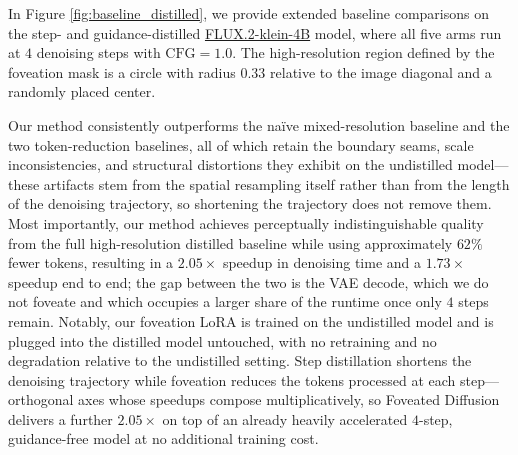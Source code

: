 
In Figure \ref{fig:baseline_distilled}, we provide extended baseline comparisons on the
step- and guidance-distilled
\href{https://huggingface.co/black-forest-labs/FLUX.2-klein-4B}{FLUX.2-klein-4B} model,
where all five arms run at $4$ denoising steps with $\text{CFG}=1.0$. The high-resolution region defined by the foveation mask is a circle
with radius $0.33$ relative to the image diagonal and a randomly placed center.

Our method consistently outperforms the na\"ive mixed-resolution baseline and the two
token-reduction baselines, all of which retain the boundary seams, scale inconsistencies,
and structural distortions they exhibit on the undistilled model---these artifacts stem
from the spatial resampling itself rather than from the length of the denoising
trajectory, so shortening the trajectory does not remove them. Most importantly, our
method achieves perceptually indistinguishable quality from the full high-resolution
distilled baseline while using approximately $62\%$ fewer tokens, resulting in a
$2.05\times$ speedup in denoising time and a $1.73\times$ speedup end to end; the gap
between the two is the VAE decode, which we do not foveate and which occupies a larger
share of the runtime once only $4$ steps remain. Notably, our foveation LoRA is trained on
the undistilled model and is plugged into the distilled model untouched, with no
retraining and no degradation relative to the undistilled setting. Step distillation
shortens the denoising trajectory while foveation reduces the tokens processed at each
step---orthogonal axes whose speedups compose multiplicatively, so Foveated Diffusion
delivers a further $2.05\times$ on top of an already heavily accelerated $4$-step,
guidance-free model at no additional training cost.
